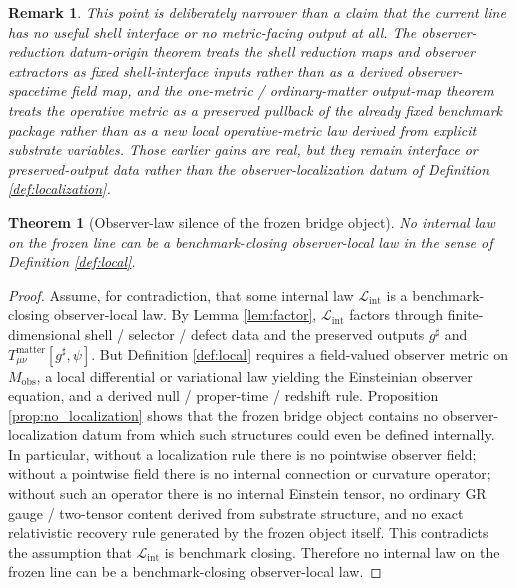 \documentclass[11pt]{article}
\newcommand{\FixedMetric}{g^{\sharp}}
\newcommand{\ObsMan}{M_{\mathrm{obs}}}
\newcommand{\InternalLaw}{\mathcal L_{\mathrm{int}}}
\newtheorem{remark}{Remark}
\newtheorem{theorem}{Theorem}
\begin{document}
\begin{remark}
This point is deliberately narrower than a claim that the current line has no useful shell interface or no metric-facing output at all. The observer-reduction datum-origin theorem treats the shell reduction maps and observer extractors as fixed shell-interface inputs rather than as a derived observer-spacetime field map, and the one-metric / ordinary-matter output-map theorem treats the operative metric as a preserved pullback of the already fixed benchmark package rather than as a new local operative-metric law derived from explicit substrate variables. Those earlier gains are real, but they remain interface or preserved-output data rather than the observer-localization datum of Definition \ref{def:localization}.
\end{remark}

\begin{theorem}[Observer-law silence of the frozen bridge object]
\label{thm:silence}
No internal law on the frozen line can be a benchmark-closing observer-local law in the sense of Definition \ref{def:local}.
\end{theorem}

\begin{proof}
Assume, for contradiction, that some internal law \(\InternalLaw\) is a benchmark-closing observer-local law. By Lemma \ref{lem:factor}, \(\InternalLaw\) factors through finite-dimensional shell / selector / defect data and the preserved outputs \(\FixedMetric\) and \(T_{\mu\nu}^{\mathrm{matter}}[\FixedMetric,\psi]\). But Definition \ref{def:local} requires a field-valued observer metric on \(\ObsMan\), a local differential or variational law yielding the Einsteinian observer equation, and a derived null / proper-time / redshift rule. Proposition \ref{prop:no_localization} shows that the frozen bridge object contains no observer-localization datum from which such structures could even be defined internally. In particular, without a localization rule there is no pointwise observer field; without a pointwise field there is no internal connection or curvature operator; without such an operator there is no internal Einstein tensor, no ordinary GR gauge / two-tensor content derived from substrate structure, and no exact relativistic recovery rule generated by the frozen object itself. This contradicts the assumption that \(\InternalLaw\) is benchmark closing. Therefore no internal law on the frozen line can be a benchmark-closing observer-local law.
\end{proof}
\end{document}

